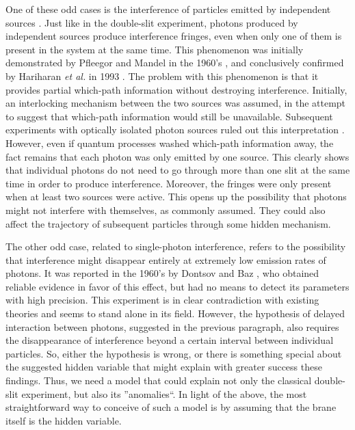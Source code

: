 \documentclass[a4paper,aps,prl,twocolumn,showpacs]{revtex4}
\begin{document}
One of these odd cases is the interference of particles emitted by
independent sources \cite{paul}. Just like in the double-slit
experiment, photons produced by independent sources produce
interference fringes, even when only one of them is present in the
system at the same time. This phenomenon was initially
demonstrated by Pfleegor and Mandel in the 1960's \cite{pfle}, and
conclusively confirmed by Hariharan \textit{et al.} in 1993
\cite{hari}. The problem with this phenomenon is that it provides
partial which-path information without destroying interference.
Initially, an interlocking mechanism between the two sources was
assumed, in the attempt to suggest that which-path information
would still be unavailable. Subsequent experiments with optically
isolated photon sources ruled out this interpretation \cite{otto}.
However, even if quantum processes washed which-path information
away, the fact remains that each photon was only emitted by one
source. This clearly shows that individual photons do not need to
go through more than one slit at the same time in order to produce
interference. Moreover, the fringes were only present when at
least two sources were active. This opens up the possibility that
photons might not interfere with themselves, as commonly assumed.
They could also affect the trajectory of subsequent particles
through some hidden mechanism.

The other odd case, related to single-photon interference, refers
to the possibility that interference might disappear entirely at
extremely low emission rates of photons. It was reported in the
1960's by Dontsov and Baz \cite{dbaz}, who obtained reliable
evidence in favor of this effect, but had no means to detect its
parameters with high precision. This experiment is in clear
contradiction with existing theories and seems to stand alone in
its field. However, the hypothesis of delayed interaction between
photons, suggested in the previous paragraph, also requires the
disappearance of interference beyond a certain interval between
individual particles. So, either the hypothesis is wrong, or there
is something special about the suggested hidden variable that
might explain with greater success these findings. Thus, we need a
model that could explain not only the classical double-slit
experiment, but also its ''anomalies``. In light of the above, the
most straightforward way to conceive of such a model is by
assuming that the brane itself is the hidden variable.
\end{document}
